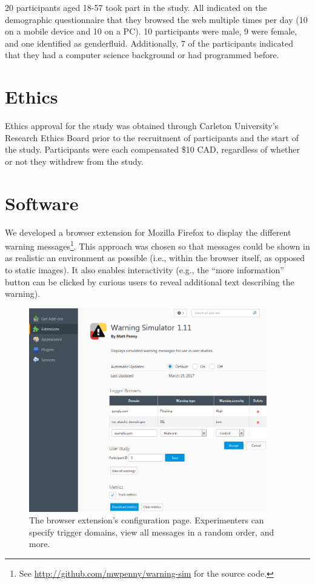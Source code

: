 20 participants aged 18-57 took part in the study. All indicated on the demographic questionnaire that they browsed the web multiple times per day (10 on a mobile device and 10 on a PC). 10 participants were male, 9 were female, and one identified as genderfluid. Additionally, 7 of the participants indicated that they had a computer science background or had programmed before.


\section{Ethics}
Ethics approval for the study was obtained through Carleton University's Research Ethics Board prior to the recruitment of participants and the start of the study. Participants were each compensated \$10 CAD, regardless of whether or not they withdrew from the study.


\section{Software}
\label{Methodology-Software}
We developed a browser extension for Mozilla Firefox to display the different warning messages\footnote{See \url{http://github.com/mwpenny/warning-sim} for the source code.}. This approach was chosen so that messages could be shown in as realistic an environment as possible (i.e., within the browser itself, as opposed to static images). It also enables interactivity (e.g., the ``more information'' button can be clicked by curious users to reveal additional text describing the warning).

\begin{figure}[th]
	\centering
	\includegraphics[width=0.925\textwidth]{Figures/Warning-Sim}
	\decoRule
	\caption[Warning simulator control panel]{The browser extension's configuration page. Experimenters can specify trigger domains, view all messages in a random order, and more.}
	\label{fig:Warning-Sim}
\end{figure}

